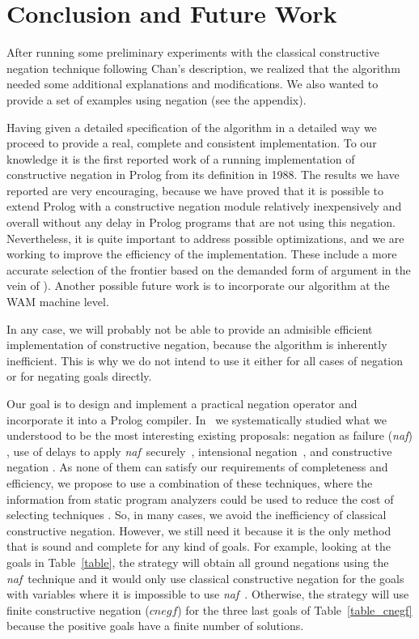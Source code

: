 \documentclass{tlp}
\newcommand{\naf}{{\em naf}}\newcommand{\viejo}[1]{}
\begin{document}
\section{Conclusion and Future Work}
\label{conclusion}
After running some preliminary experiments with the classical constructive 
negation technique  following Chan's description, we realized that the
algorithm needed some additional explanations and modifications. We also
wanted to provide a set of examples using negation (see the appendix).

Having given a detailed specification of the algorithm in a detailed way
we proceed to provide a real, complete and consistent
implementation. To our knowledge it is the first reported work of a running
implementation
of constructive negation in Prolog from its definition in 1988. 
The results we have reported are very encouraging,
because we have proved that it is possible to extend Prolog with a
constructive negation module relatively inexpensively and overall
without any delay in Prolog programs that are not using this
negation. Nevertheless, it is quite important to address possible
optimizations, and we are working to improve the efficiency of the
implementation. These include a more accurate selection of the
frontier based on the demanded form of argument in the vein of
\cite{Moreno2}). 
Another possible future work is to incorporate our algorithm
at the WAM machine level.

In any case, we will probably not be able to provide an admisible efficient
implementation of constructive negation, because the algorithm is
inherently inefficient.  This is why we do not intend to
use it either for all cases of negation or for negating goals
directly.

Our goal is to design and implement a practical negation operator and
incorporate it into a Prolog compiler.
In~\cite{SusanaPADL2000,SusanaLPAR01} we systematically studied what
we understood to be the most interesting existing proposals: negation
as failure (\naf) \cite{Clark}, use of delays to apply \naf\
securely~\cite{naish:lncs}, intensional
negation~\cite{Barbuti1,Barbuti2}, and constructive negation
\cite{Chan1,Chan2,Drabent,Stuckey,Stuckey95}. As none of them can
satisfy our requirements of completeness and efficiency, we propose to
use a combination of these techniques, where the information from
static program analyzers could be used to reduce the cost of selecting
techniques \cite{SusanaLPAR01}. So, in many cases, we avoid the
inefficiency of classical constructive negation. However, we still
need it because it is the only method that is sound and complete for
any kind of goals. For example, looking at the goals in
Table~\ref{table}, the strategy will obtain all ground negations using
the \naf\ technique and it would only use classical constructive
negation for the goals with variables where it is impossible to use
\naf\ . Otherwise, the strategy will use finite constructive negation
($cnegf$) for the three last goals of Table~\ref{table_cnegf} because
the positive goals have a finite number of solutions.
\end{document}
